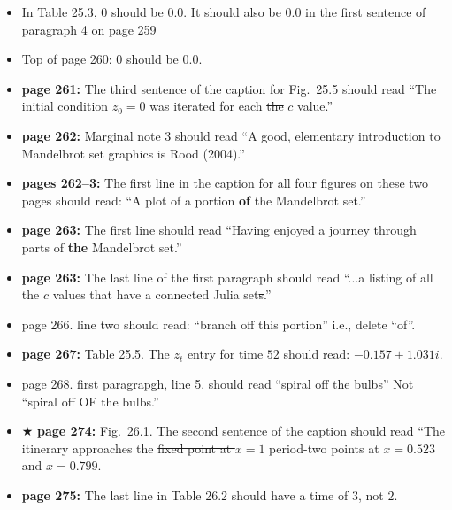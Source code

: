 \documentclass[12pt]{article}
\begin{document}
\begin{itemize}
  \item  In Table 25.3, 0 should be 0.0.  It should also be 0.0 in the
   first sentence of paragraph 4 on page 259

  \item Top of page 260:  0 should be 0.0.

  \item {\bf page 261:} The third sentence of the caption for
    Fig.~25.5 should read ``The initial condition $z_0 = 0$ was
    iterated for each \sout{the} $c$ value.''

  \item {\bf page 262:}  Marginal note 3 should read ``A good,
    elementary introduction to Mandelbrot set graphics is Rood
    (2004).'' %

  \item {\bf pages 262--3:}  The first line in the caption for all
    four figures on these two pages should read: ``A plot of a portion
    {\bf of} the Mandelbrot set.'' %

  \item {\bf page 263:}  The first line should read ``Having enjoyed a
    journey through parts of {\bf the} Mandelbrot set.''

  \item {\bf page 263:} The last line of the first paragraph should
    read ``...a listing of all the $c$ values that have a connected
    Julia set\sout{s}.''

   \item page 266.  line two should read:  ``branch off this portion''
    i.e., delete ``of''.

  \item {\bf page 267:}  Table 25.5.  The $z_t$ entry for time $52$
    should read: $-0.157 + 1.031i$.

  \item page 268.  first paragrapgh, line 5.  should read ``spiral off the
   bulbs''  Not ``spiral off OF the bulbs.''

  \item $\bigstar$ {\bf page 274:} Fig.~26.1.  The second sentence of
    the caption should read ``The itinerary approaches the
    \sout{fixed point at $x=1$} period-two points at $x=0.523$ and 
    $x=0.799$. 

  \item {\bf page 275:} The last line in Table 26.2 should have a time
    of $3$, not $2$.


\end{itemize}
\end{document}
